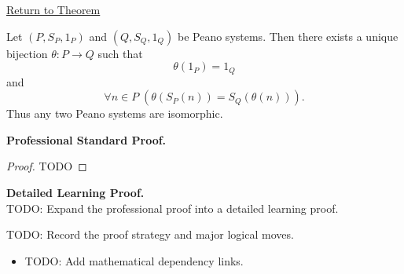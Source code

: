 \newpage
{}
\label{prf:uniqueness-of-peano-systems-up-to-isomorphism}

\begin{remark*}[Return]
\hyperref[thm:uniqueness-of-peano-systems-up-to-isomorphism]{Return to Theorem}
\end{remark*}

\begin{theorem*}
Let $(P,S_P,1_P)$ and $(Q,S_Q,1_Q)$ be Peano systems. Then there exists a
unique bijection $\theta:P\to Q$ such that
\[
\theta(1_P)=1_Q
\]
and
\[
\forall n\in P\;(\theta(S_P(n))=S_Q(\theta(n))).
\]
Thus any two Peano systems are isomorphic.
\end{theorem*}

\textbf{Professional Standard Proof.}~\\
\begin{proof}
TODO
\end{proof}

\textbf{Detailed Learning Proof.}~\\
TODO: Expand the professional proof into a detailed learning proof.

\begin{remark*}
TODO: Record the proof strategy and major logical moves.
\end{remark*}

\begin{dependencies}
\begin{itemize}
  \item TODO: Add mathematical dependency links.
\end{itemize}
\end{dependencies}
